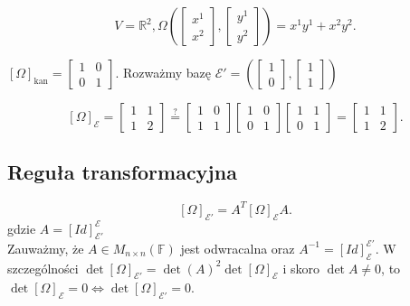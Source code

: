 \documentclass[../main.tex]{subfiles}
\begin{document}
    \begin{przyklad}
        \[
        V = \mathbb{R}^2, \Omega\left(\begin{bmatrix} x^1\\x^2 \end{bmatrix} , \begin{bmatrix} y^1\\y^2 \end{bmatrix} \right) = x^1y^1 + x^2y^2
        .\]

        $\left[ \Omega \right] _{\text{kan}} = \begin{bmatrix} 1&0\\0&1 \end{bmatrix}$. Rozważmy bazę $\mathcal{E}' = \left( \begin{bmatrix} 1\\0 \end{bmatrix} , \begin{bmatrix} 1\\1 \end{bmatrix}  \right) $

        \[
            \left[ \Omega \right] _\mathcal{E} = \begin{bmatrix} 1&1\\1&2 \end{bmatrix} \overset{?}{=} \begin{bmatrix} 1&0\\1&1 \end{bmatrix} \begin{bmatrix} 1&0\\0&1 \end{bmatrix} \begin{bmatrix} 1&1\\0&1 \end{bmatrix} = \begin{bmatrix} 1&1\\1&2 \end{bmatrix}
        .\]
    \end{przyklad}

    \subsection{Reguła transformacyjna}

    \[
        \left[ \Omega \right] _{\mathcal{E}'} = A^T \left[ \Omega \right] _\mathcal{E} A
    .\] gdzie $A = \left[ Id \right] _{\mathcal{E}'}^\mathcal{E}$ \\
    Zauważmy, że $A\in M_{n \times n}(\mathbb{F})$ jest odwracalna oraz $A^{-1} = \left[ Id \right] _{\mathcal{E}}^{\mathcal{E}'}$. W szczególności $\det \left[ \Omega \right] _{\mathcal{E}'} = \det(A)^2 \det \left[ \Omega \right] _\mathcal{E}$ i skoro $\det A \neq 0$, to $\det \left[ \Omega \right] _\mathcal{E} = 0 \iff \det \left[ \Omega \right] _{\mathcal{E}'} = 0$.
\end{document}

